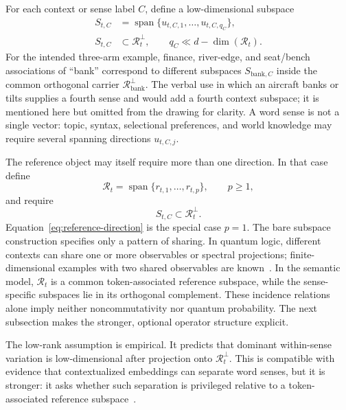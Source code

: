 \documentclass[
  aps,
  reprint,
  superscriptaddress,
  floatfix,
  nofootinbib,
  longbibliography
]{revtex4-2}
\DeclareMathOperator{\spanop}{span}
\begin{document}
For each context or sense label $C$, define a low-dimensional subspace
%
\begin{equation}
\label{eq:sense-subspace}
\begin{aligned}
S_{t,C}&=\spanop\{u_{t,C,1},\dots,u_{t,C,q_C}\},\\
S_{t,C}&\subset\mathcal R_t^\perp,
\qquad q_C\ll d-\dim(\mathcal R_t) .
\end{aligned}
\end{equation}
%
For the intended three-arm example, finance, river-edge, and seat/bench
associations of ``bank'' correspond to different subspaces
$S_{\mathrm{bank},C}$ inside the common orthogonal carrier
$\mathcal R_{\mathrm{bank}}^\perp$.  The verbal use in which an aircraft
banks or tilts supplies a fourth sense and would add a fourth context
subspace; it is mentioned here but omitted from the drawing for clarity.  A
word sense is not a single vector: topic, syntax, selectional preferences,
and world knowledge may require several spanning directions $u_{t,C,j}$.

The reference object may itself require more than one direction. In that
case define
%
\begin{equation}
\label{eq:reference-subspace}
\mathcal R_t=
\spanop\{r_{t,1},\dots,r_{t,p}\},
\qquad p\ge1,
\end{equation}
%
and require
%
\begin{equation}
\label{eq:multi-sense-subspace}
S_{t,C}\subset\mathcal R_t^\perp .
\end{equation}
%
Equation~\eqref{eq:reference-direction} is the special case $p=1$.
The bare subspace construction specifies only a pattern of sharing. In
quantum logic, different contexts can share one or more observables or
spectral projections; finite-dimensional examples with two shared
observables are known~\cite{svozil:040102}. In the semantic model,
$\mathcal R_t$ is a common token-associated reference subspace, while the
sense-specific subspaces lie in its orthogonal complement. These incidence
relations alone imply neither noncommutativity nor quantum probability. The
next subsection makes the stronger, optional operator structure explicit.

The low-rank assumption is empirical. It predicts that dominant
within-sense variation is low-dimensional after projection onto
$\mathcal R_t^\perp$. This is compatible with evidence that contextualized
embeddings can separate word senses, but it is stronger: it asks whether
such separation is privileged relative to a token-associated reference
subspace~\cite{wiedemann2019does,scarlini2020ares}.
\end{document}
